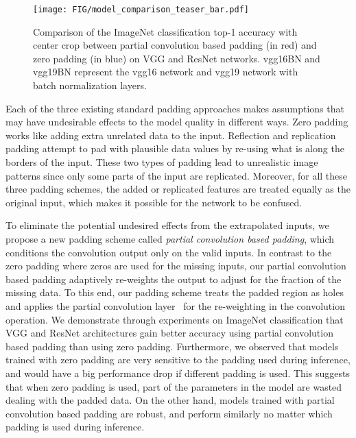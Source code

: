 \documentclass[10pt,twocolumn,letterpaper]{article}
\begin{document}
\begin{figure}
    \centering
    \texttt{[image: FIG/model\_comparison\_teaser\_bar.pdf]}
    \caption{Comparison of the ImageNet classification top-1 accuracy with center crop between partial convolution based padding (in red) and zero padding (in blue) on VGG and ResNet networks. vgg16BN and vgg19BN represent the vgg16 network and vgg19 network with batch normalization layers.}
    \label{fig:teaser}
\end{figure}

Each of the three existing standard padding approaches makes assumptions that may have undesirable effects to the model quality in different ways. Zero padding works like adding extra unrelated data to the input. Reflection and replication padding attempt to pad with plausible data values by re-using what is along the borders of the input. These two types of padding lead to unrealistic image patterns since only some parts of the input are replicated. Moreover, for all these three padding schemes, the added or replicated features are treated equally as the original input, which makes it possible for the network to be confused. 


To eliminate the potential undesired effects from the extrapolated inputs, we propose a new padding scheme called \textit{partial convolution based padding}, which conditions the convolution output only on the valid inputs. In contrast to the zero padding where zeros are used for the missing inputs, our partial convolution based padding adaptively re-weights the output to adjust for the fraction of the missing data. To this end, our padding scheme treats the padded region as holes and applies the partial convolution layer~\cite{liu2018image} for the re-weighting in the convolution operation. We demonstrate through experiments on ImageNet classification that VGG and ResNet architectures gain better accuracy using partial convolution based padding than using zero padding.
Furthermore, we observed that models trained with zero padding are very sensitive to the padding used during inference, and would have a big performance drop if different padding is used. This suggests that when zero padding is used, part of the parameters in the model are wasted dealing with the padded data. On the other hand, models trained with partial convolution based padding are robust, and perform similarly no matter which padding is used during inference.
\end{document}
